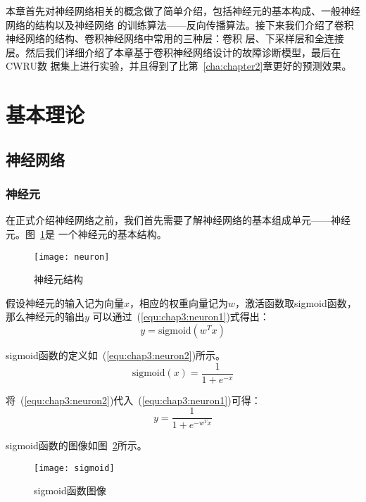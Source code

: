 本章首先对神经网络相关的概念做了简单介绍，包括神经元的基本构成、一般神经网络的结构以及神经网络
的训练算法——反向传播算法。接下来我们介绍了卷积神经网络的结构、卷积神经网络中常用的三种层：卷积
层、下采样层和全连接层。然后我们详细介绍了本章基于卷积神经网络设计的故障诊断模型，最后在CWRU数
据集上进行实验，并且得到了比第~\ref{cha:chapter2}章更好的预测效果。

\section{基本理论}

\subsection{神经网络}
\label{subsection:nn}

\subsubsection{神经元}

在正式介绍神经网络之前，我们首先需要了解神经网络的基本组成单元——神经元。图~\ref{fig:neuron}是
一个神经元的基本结构。
\begin{figure}[ht]
  \centering%
  \texttt{[image: neuron]}
  \caption{神经元结构}
  \label{fig:neuron}
\end{figure}

假设神经元的输入记为向量$x$，相应的权重向量记为$w$，激活函数取sigmoid函数，那么神经元的输出$y$
可以通过~(\ref{equ:chap3:neuron1})式得出：
\begin{equation}
  \label{equ:chap3:neuron1}
  y = \text{sigmoid}(w^Tx)
\end{equation}

sigmoid函数的定义如~(\ref{equ:chap3:neuron2})所示。
\begin{equation}
  \label{equ:chap3:neuron2}
  \text{sigmoid}(x) = \frac{1}{1+e^{-x}}
\end{equation}

将~(\ref{equ:chap3:neuron2})代入~(\ref{equ:chap3:neuron1})可得：
\begin{equation}
  \label{equ:chap3:neuron3}
  y = \frac{1}{1+e^{-w^Tx}}
\end{equation}

sigmoid函数的图像如图~\ref{fig:sigmoid}所示。
\begin{figure}[ht]
  \centering
  \texttt{[image: sigmoid]}
  \caption{sigmoid函数图像}
  \label{fig:sigmoid}
\end{figure}

